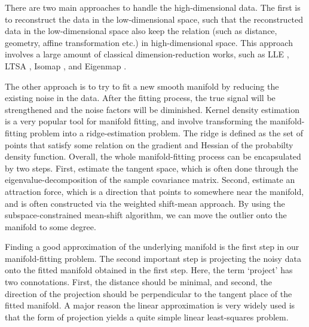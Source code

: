 \documentclass{article}
\theoremstyle{remark}
\begin{document}
 
There are two main approaches to handle the high-dimensional data. The first is to reconstruct the data in the low-dimensional space, such that the reconstructed data in the low-dimensional space also keep the relation (such as distance, geometry, affine transformation etc.) in high-dimensional space. This approach involves a large amount of classical dimension-reduction works, such as LLE \cite{roweis2000nonlinear}, LTSA \cite{zhang2004principal,zha2009spectral}, Isomap \cite{tenenbaum2000global}, and Eigenmap \cite{belkin2003laplacian}.
 
The other approach is to try to fit a new smooth manifold by reducing the existing noise in the data. After the fitting process, the true signal will be strengthened and the noise factors will be diminished. Kernel density estimation \cite{genovese2014nonparametric,ozertem2011locally} is a very popular tool for manifold fitting, and involve transforming the manifold-fitting problem into a ridge-estimation problem. The ridge is defined as the set of points that satisfy some relation on the gradient and Hessian of the probabilty density function. Overall, the whole manifold-fitting process can be encapsulated  by two steps. First, estimate the tangent space, which is often done through the eigenvalue-decomposition of the sample covariance matrix. Second,  estimate an attraction force, which is a  direction that points to somewhere near the manifold, and is often constructed via the weighted shift-mean approach. By using the subspace-constrained mean-shift algorithm, we can move the outlier onto the manifold to some degree.
 

Finding a good approximation of the underlying manifold is the first step in our manifold-fitting problem. The second important step is projecting the noisy data onto the fitted manifold obtained in the first step. Here, the term `project' has two connotations. First, the distance should be minimal, and second, the direction of the projection should be perpendicular to the tangent place of the fitted manifold. A major reason  the linear approximation is very widely used is that the form of projection yields a quite simple linear least-squares problem.
\end{document}
